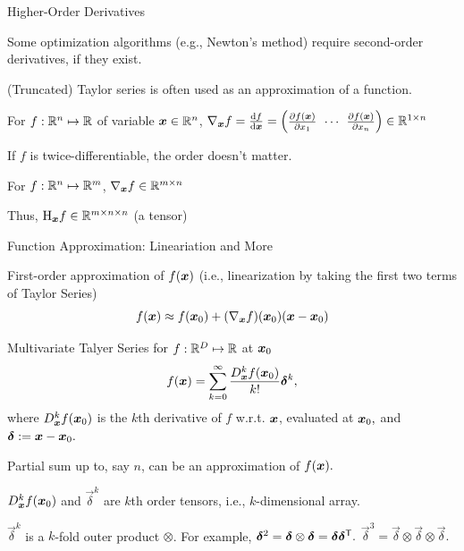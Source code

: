 \documentclass[fleqn,aspectratio=169]{beamer}
\begin{document}
\begin{frame}{Higher-Order Derivatives}

\plitemsep 0.05in

\bci 
\item Some optimization algorithms (e.g., Newton's method) require second-order derivatives, if they exist. 
\item (Truncated) Taylor series is often used as an approximation of a function. 

\item For $f: {\mathbb R}^{n} \mapsto {\mathbb R}$ of variable $\bm{x} \in {\mathbb R}^{n}$, $
\grad_{\vec{x}} f = \d{f}{\vec{x}} = 
\rowvec{\pd{f(\vec{x})}{x_1} & \cdots & \pd{f(\vec{x})}{x_n}} \in \real^{1 \times n}
$
\bci
\item If $f$ is twice-differentiable, the order doesn't matter. 
\eci

\item For $f: {\mathbb R}^{n} \mapsto {\mathbb R}^{m}$, $\nabla _{\bm{x}} f \in {\mathbb R}^{m \times n}$
\bci
\item Thus, $\text{H} _{\bm{x}} f \in {\mathbb R}^{m \times n \times n}$ (a tensor)
\eci

\eci
\end{frame}

\begin{frame}{Function Approximation: Lineariation and More}

\plitemsep 0.1in

\bci 
\item First-order approximation of $f(\bm{x})$ (i.e., linearization by taking the first two terms of Taylor Series)
$$
f(\bm{x}) \approx f(\bm{x}_0) + (\nabla _{\bm{x}} f)(\bm{x}_0)(\bm{x}-\bm{x}_0)
$$

\item Multivariate Talyer Series for $f: {\mathbb R}^D \mapsto {\mathbb R}$ at $\bm{x}_0$
$$
f(\bm{x}) = \sum_{k=0}^\infty \frac{D^k_{\bm{x}} f(\bm{x}_0)}{k!} \bm{\delta}^k,
$$
where $D^k_{\bm{x}} f(\bm{x}_0)$ is the $k$th derivative of $f$ w.r.t. $\bm{x}$, evaluated at $\bm{x}_0,$ and $\bm{\delta} := \bm{x} - \bm{x}_0.$
\bci
\item Partial sum up to, say $n$, can be an approximation of $f(\bm{x}).$
\item $D^k_{\bm{x}} f(\bm{x}_0)$ and $\vec{\delta}^k$ are $k$th order tensors, i.e., $k$-dimensional array. 

\item $\vec{\delta}^k$ is a $k$-fold outer product $\otimes$. For example, $\bm{\delta}^2 = \bm{\delta} \otimes \bm{\delta} = \bm{\delta}{\bm{\delta}}^{\mathsf{T}}.$ $\vec{\delta}^3 = \vec{\delta} \otimes \vec{\delta} \otimes \vec{\delta}.$ 
\eci

\eci



\end{frame}
\end{document}
